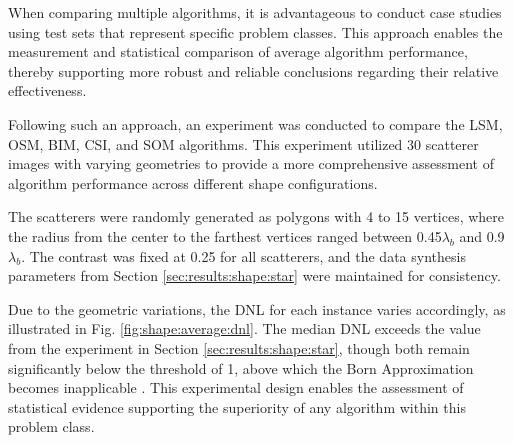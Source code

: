 \documentclass{IEEEtran}
\begin{document}
                When comparing multiple algorithms, it is advantageous to conduct case studies using test sets that represent specific problem classes. This approach enables the measurement and statistical comparison of average algorithm performance, thereby supporting more robust and reliable conclusions regarding their relative effectiveness.
                

                Following such an approach, an experiment was conducted to compare the LSM, OSM, BIM, CSI, and SOM algorithms. This experiment utilized 30 scatterer images with varying geometries to provide a more comprehensive assessment of algorithm performance across different shape configurations.

                The scatterers were randomly generated as polygons with 4 to 15 vertices, where the radius from the center to the farthest vertices ranged between 0.45$\lambda_b$ and 0.9$\lambda_b$. The contrast was fixed at 0.25 for all scatterers, and the data synthesis parameters from Section \ref{sec:results:shape:star} were maintained for consistency. 

                Due to the geometric variations, the DNL for each instance varies accordingly, as illustrated in Fig. \ref{fig:shape:average:dnl}. The median DNL exceeds the value from the experiment in Section \ref{sec:results:shape:star}, though both remain significantly below the threshold of 1, above which the Born Approximation becomes inapplicable \cite{bucci2001degree}. This experimental design enables the assessment of statistical evidence supporting the superiority of any algorithm within this problem class.
\end{document}

